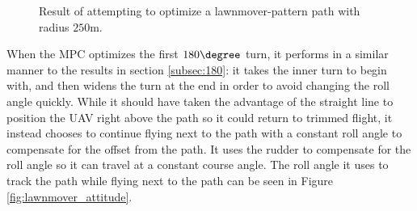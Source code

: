 \begin{figure}
	\caption{Result of attempting to optimize a lawnmover-pattern path with radius $250$m.}
	\label{fig:lawnmover}
\end{figure}

When the MPC optimizes the first $180\degree$ turn, it performs in a similar manner to the results in section \ref{subsec:180}: it takes the inner turn to begin with, and then widens the turn at the end in order to avoid changing the roll angle quickly. While it should have taken the advantage of the straight line to position the UAV right above the path so it could return to trimmed flight, it instead chooses to continue flying next to the path with a constant roll angle to compensate for the offset from the path. It uses the rudder to compensate for the roll angle so it can travel at a constant course angle. The roll angle it uses to track the path while flying next to the path can be seen in Figure \ref{fig:lawnmover_attitude}.

